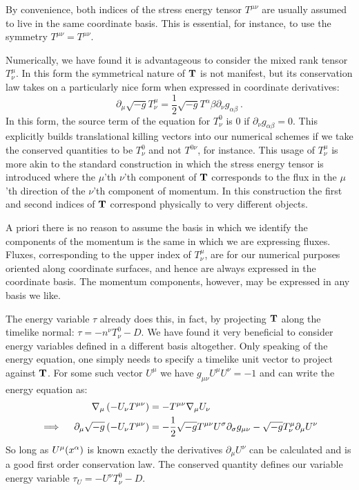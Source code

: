 By convenience, both indices of the stress energy tensor $T^{\mu\nu}$ are usually assumed to live in the same coordinate basis.  This is essential, for instance, to use the symmetry $T^{\mu\nu} = T^{\mu\nu}$.

Numerically, we have found it is advantageous to consider the mixed rank tensor $T^\mu_\nu$.  In this form the symmetrical nature of ${\bf T}$ is not manifest, but its conservation law takes on a particularly nice form when expressed in coordinate derivatives:
\begin{equation}
	\partial_\mu \sqrt{-g} T^\mu_\nu = \frac{1}{2}\sqrt{-g}T^{\alpha}{\beta}\partial_\nu g_{\alpha \beta}\ .
\end{equation}
In this form, the source term of the equation for $T^0_\nu$ is 0 if $\partial_\nu g_{\alpha \beta} = 0$.  This explicitly builds translational killing vectors into our numerical schemes if we take the conserved quantities to be $T^0_\nu$ and not $T^{0\nu}$, for instance.  This usage of $T^\mu_\nu$ is more akin to the standard construction in which the stress energy tensor is introduced where the $\mu$'th $\nu$'th component of ${\bf T}$ corresponds to the flux in the $\mu$'th direction of the $\nu$'th component of momentum.  In this construction the first and second indices of ${\bf T}$ correspond physically to very different objects.

A priori there is no reason to assume the basis in which we identify the components of the momentum is the same in which we are expressing fluxes.  Fluxes, corresponding to the upper index of $T^\mu_\nu$, are for our numerical purposes oriented along coordinate surfaces, and hence are always expressed in the coordinate basis.  The momentum components, however, may be expressed in any basis we like.  

The energy variable $\tau$ already does this, in fact, by projecting ${\bf T}$ along the timelike normal: $\tau = -n^\nu T^0_\nu - D$.  We have found it very beneficial to consider energy variables defined in a different basis altogether.  Only speaking of the energy equation, one simply needs to specify a timelike unit vector to project against ${\bf T}$.  For some such vector $U^\mu$ we have $g_{\mu\nu}U^\mu U^\nu = -1$ and can write the energy equation as:
\begin{align}
	\nabla_\mu \left( -U_\nu T^{\mu\nu}\right) &= -T^{\mu\nu}\nabla_\mu U_\nu \\
\implies \quad	\partial_\mu \sqrt{-g} \left(-U_\nu T^{\mu\nu}\right) &= -\frac{1}{2}\sqrt{-g}T^{\mu\nu}U^\sig\partial_\sig g_{\mu\nu} - \sqrt{-g}T^\mu_\nu \partial_\mu U^\nu \eqlabel{UTmunu}
\end{align}
So long as $U^\mu(x^\alpha)$ is known exactly the derivatives $\partial_\mu U^\nu$ can be calculated and  is a good first order conservation law.  The conserved quantity defines our variable energy variable $\tau_U = -U^\nu T^0_\nu - D$.


